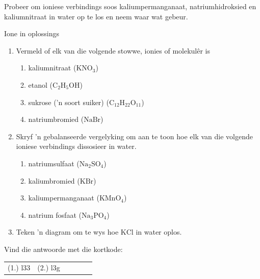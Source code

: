     \noindent
Probeer om ioniese verbindings soos kaliumpermanganaat, natriumhidroksied en kaliumnitraat in water op te los en neem waar wat gebeur. 
  \label{m38720*secfhsst!!!underscore!!!id338}
            \begin{exercises}{Ione in oplossings}
            \nopagebreak \noindent
            \label{m38720*id336094}\begin{enumerate}[noitemsep, label=\textbf{\arabic*}. ] 
            \label{m38720*uid22}\item Vermeld of elk van die volgende stowwe, ionies of molekul\^{e}r is
\label{m38720*id336110}\begin{enumerate}[noitemsep, label=\textbf{\alph*}. ] 
            \label{m38720*uid23}\item kaliumnitraat ($\text{KNO}_{3}$)
\label{m38720*uid24}\item etanol ($\text{C}_{2}\text{H}_{5}\text{OH}$)
\label{m38720*uid25}\item sukrose ('n soort suiker) ($\text{C}_{12}\text{H}_{22}\text{O}_{11}$)
\label{m38720*uid26}\item natriumbromied ($\text{NaBr}$)
\end{enumerate}
\label{m38720*uid27}\item Skryf 'n gebalanseerde vergelyking om aan te toon hoe elk van die volgende ioniese verbindings dissosieer in water.
\label{m38720*id336252}\begin{enumerate}[noitemsep, label=\textbf{\alph*}. ] 
            \label{m38720*uid28}\item natriumsulfaat ($\text{Na}_{2}\text{SO}_{4}$)
\label{m38720*uid29}\item kaliumbromied ($\text{KBr}$)
\label{m38720*uid30}\item kaliumpermanganaat ($\text{KMnO}_{4}$)
\label{m38720*uid31}\item natrium fosfaat ($\text{Na}_{3}\text{PO}_{4}$)
\end{enumerate}
\item Teken 'n diagram om te wys hoe $\text{KCl}$ in water oplos.
\end{enumerate}
      \label{m38720*uid32}
\par {} Vind die antwoorde met die kortkode:
 \par \begin{tabular}[h]{cccccc}
 (1.) l33  &  (2.) l3g  & \end{tabular}
\end{exercises}
